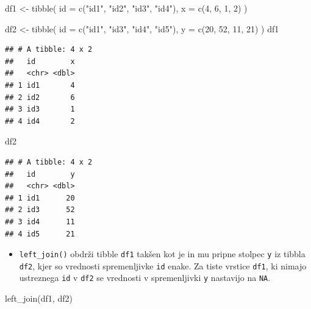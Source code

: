\documentclass[
]{book}
\newenvironment{Shaded}{\begin{snugshade}}{\end{snugshade}}
\newcommand{\AttributeTok}[1]{\textcolor[rgb]{0.77,0.63,0.00}{#1}}
\newcommand{\DecValTok}[1]{\textcolor[rgb]{0.00,0.00,0.81}{#1}}
\newcommand{\FunctionTok}[1]{\textcolor[rgb]{0.00,0.00,0.00}{#1}}
\newcommand{\NormalTok}[1]{#1}
\newcommand{\OtherTok}[1]{\textcolor[rgb]{0.56,0.35,0.01}{#1}}
\newcommand{\StringTok}[1]{\textcolor[rgb]{0.31,0.60,0.02}{#1}}
\providecommand{\tightlist}{%
  \setlength{\itemsep}{0pt}\setlength{\parskip}{0pt}}
\begin{document}
\begin{Shaded}
\begin{Highlighting}[]
\NormalTok{df1 }\OtherTok{\textless{}{-}} \FunctionTok{tibble}\NormalTok{(}
  \AttributeTok{id =} \FunctionTok{c}\NormalTok{(}\StringTok{"id1"}\NormalTok{, }\StringTok{"id2"}\NormalTok{, }\StringTok{"id3"}\NormalTok{, }\StringTok{"id4"}\NormalTok{),}
  \AttributeTok{x =} \FunctionTok{c}\NormalTok{(}\DecValTok{4}\NormalTok{, }\DecValTok{6}\NormalTok{, }\DecValTok{1}\NormalTok{, }\DecValTok{2}\NormalTok{)}
\NormalTok{)}

\NormalTok{df2 }\OtherTok{\textless{}{-}} \FunctionTok{tibble}\NormalTok{(}
  \AttributeTok{id =} \FunctionTok{c}\NormalTok{(}\StringTok{"id1"}\NormalTok{, }\StringTok{"id3"}\NormalTok{, }\StringTok{"id4"}\NormalTok{, }\StringTok{"id5"}\NormalTok{),}
  \AttributeTok{y =} \FunctionTok{c}\NormalTok{(}\DecValTok{20}\NormalTok{, }\DecValTok{52}\NormalTok{, }\DecValTok{11}\NormalTok{, }\DecValTok{21}\NormalTok{)}
\NormalTok{)}
\NormalTok{df1}
\end{Highlighting}
\end{Shaded}

\begin{verbatim}
## # A tibble: 4 x 2
##   id        x
##   <chr> <dbl>
## 1 id1       4
## 2 id2       6
## 3 id3       1
## 4 id4       2
\end{verbatim}

\begin{Shaded}
\begin{Highlighting}[]
\NormalTok{df2}
\end{Highlighting}
\end{Shaded}

\begin{verbatim}
## # A tibble: 4 x 2
##   id        y
##   <chr> <dbl>
## 1 id1      20
## 2 id3      52
## 3 id4      11
## 4 id5      21
\end{verbatim}

\begin{itemize}
\tightlist
\item
  \texttt{left\_join()} obdrži tibble \texttt{df1} takšen kot je in mu pripne stolpec \texttt{y} iz tibbla \texttt{df2}, kjer so vrednosti spremenljivke \texttt{id} enake. Za tiste vrstice \texttt{df1}, ki nimajo ustreznega \texttt{id} v \texttt{df2} se vrednosti v spremenljivki \texttt{y} nastavijo na \texttt{NA}.
\end{itemize}

\begin{Shaded}
\begin{Highlighting}[]
\FunctionTok{left\_join}\NormalTok{(df1, df2)}
\end{Highlighting}
\end{Shaded}
\end{document}
